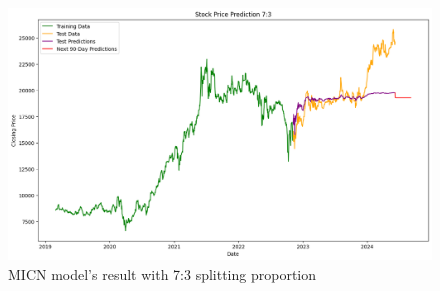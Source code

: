 \documentclass{ieeeojies}
\begin{document}
\begin{figure}[H]
  \centering
  \begin{minipage}{0.8\linewidth}
    \centering
    \includegraphics[width=\linewidth]{bibliography/ACB-MICN-7-3.png}
    \caption{MICN model's result with 7:3 splitting proportion}
    \label{fig19}
  \end{minipage}
\end{figure}
\end{document}
